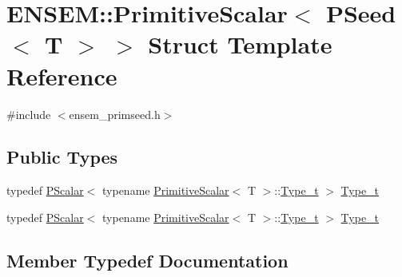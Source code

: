 \hypertarget{structENSEM_1_1PrimitiveScalar_3_01PSeed_3_01T_01_4_01_4}{}\section{E\+N\+S\+EM\+:\+:Primitive\+Scalar$<$ P\+Seed$<$ T $>$ $>$ Struct Template Reference}
\label{structENSEM_1_1PrimitiveScalar_3_01PSeed_3_01T_01_4_01_4}


{\ttfamily \#include $<$ensem\+\_\+primseed.\+h$>$}

\subsection*{Public Types}
\begin{DoxyCompactItemize}
\item 
typedef \mbox{\hyperlink{classENSEM_1_1PScalar}{P\+Scalar}}$<$ typename \mbox{\hyperlink{structENSEM_1_1PrimitiveScalar}{Primitive\+Scalar}}$<$ T $>$\+::\mbox{\hyperlink{structENSEM_1_1PrimitiveScalar_3_01PSeed_3_01T_01_4_01_4_a222ab5cf9af822b8b516473da4b5a787}{Type\+\_\+t}} $>$ \mbox{\hyperlink{structENSEM_1_1PrimitiveScalar_3_01PSeed_3_01T_01_4_01_4_a222ab5cf9af822b8b516473da4b5a787}{Type\+\_\+t}}
\item 
typedef \mbox{\hyperlink{classENSEM_1_1PScalar}{P\+Scalar}}$<$ typename \mbox{\hyperlink{structENSEM_1_1PrimitiveScalar}{Primitive\+Scalar}}$<$ T $>$\+::\mbox{\hyperlink{structENSEM_1_1PrimitiveScalar_3_01PSeed_3_01T_01_4_01_4_a222ab5cf9af822b8b516473da4b5a787}{Type\+\_\+t}} $>$ \mbox{\hyperlink{structENSEM_1_1PrimitiveScalar_3_01PSeed_3_01T_01_4_01_4_a222ab5cf9af822b8b516473da4b5a787}{Type\+\_\+t}}
\end{DoxyCompactItemize}


\subsection{Member Typedef Documentation}
\mbox{\label{structENSEM_1_1PrimitiveScalar_3_01PSeed_3_01T_01_4_01_4_a222ab5cf9af822b8b516473da4b5a787}} 

